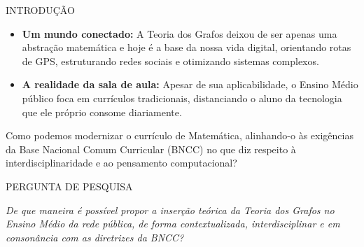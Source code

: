 \documentclass[10pt, aspectratio=169]{beamer}
\begin{document}
\begin{frame}{INTRODUÇÃO}
  \vspace{0.2cm}
  \begin{itemize}
    \item \textbf{Um mundo conectado:} A Teoria dos Grafos deixou de ser apenas uma abstração matemática e hoje é a base da nossa vida digital, orientando rotas de GPS, estruturando redes sociais e otimizando sistemas complexos.
    \vspace{0.3cm}
    \item \textbf{A realidade da sala de aula:} Apesar de sua aplicabilidade, o Ensino Médio público foca em currículos tradicionais, distanciando o aluno da tecnologia que ele próprio consome diariamente.
  \end{itemize}
  
  \vfill
  
  \begin{tcolorbox}[colback=uescgreen!5!white, colframe=uescgreen, arc=2mm, title=\textbf{Problematização}]
    Como podemos modernizar o currículo de Matemática, alinhando-o às exigências da Base Nacional Comum Curricular (BNCC) no que diz respeito à interdisciplinaridade e ao pensamento computacional?
  \end{tcolorbox}
\end{frame}

\begin{frame}{PERGUNTA DE PESQUISA}
  \vfill
  \begin{center}
    \begin{tcolorbox}[colback=uescgreen!5!white, colframe=uescgreen, width=0.95\textwidth, arc=4mm, boxsep=5mm]
      \centering
      \Large \itshape
      De que maneira é possível propor a inserção teórica da Teoria dos Grafos no Ensino Médio da rede pública, de forma contextualizada, interdisciplinar e em consonância com as diretrizes da BNCC?
    \end{tcolorbox}
  \end{center}
  \vfill
\end{frame}
\end{document}

